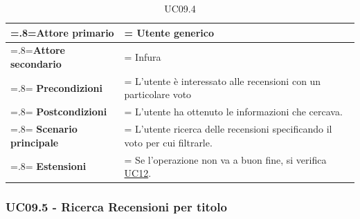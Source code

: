             \begin{table}[H]
                \centering
                \renewcommand{\arraystretch}{1.8}
                \renewcommand\tabularxcolumn[1]{m{#1}}
                \begin{tabularx}{0.9\textwidth} {
                    >{\hsize=.8\hsize\linewidth=\hsize}X
                    >{\hsize=1.2\hsize\linewidth=\hsize}X}
                    \hline
                    \textbf{Attore primario} & Utente generico \\
                    \hline
                    \textbf{Attore secondario} & Infura \\
                    \hline
                    \textbf{Precondizioni} & L'utente è interessato alle recensioni con un particolare voto \\
                    \hline
                    \textbf{Postcondizioni} & L'utente ha ottenuto le informazioni che cercava. \\
                    \hline
                    \textbf{Scenario principale} & L'utente ricerca delle recensioni specificando il voto per cui filtrarle.\\
                    \hline
                    \textbf{Estensioni} & Se l'operazione non va a buon fine, si verifica \hyperref[UC12]{UC12}. \\
                    \hline
                \end{tabularx}
                \caption{UC09.4}
            \end{table}

        \subsubsection{UC09.5 - Ricerca Recensioni per titolo}
        \label{UC09.5}


